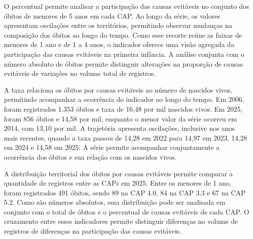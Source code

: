 
O percentual permite analisar a participação das causas evitáveis no conjunto dos óbitos de menores de 5 anos em cada CAP. Ao longo da série, os valores apresentam oscilações entre os territórios, permitindo observar mudanças na composição dos óbitos ao longo do tempo. Como esse recorte reúne as faixas de menores de 1 ano e de 1 a 4 anos, o indicador oferece uma visão agregada da participação das causas evitáveis na primeira infância. A análise conjunta com o número absoluto de óbitos permite distinguir alterações na proporção de causas evitáveis de variações no volume total de registros.


A taxa relaciona os óbitos por causas evitáveis ao número de nascidos vivos, permitindo acompanhar a ocorrência do indicador ao longo do tempo. Em 2006, foram registrados 1.353 óbitos e taxa de 16,48 por mil nascidos vivos. Em 2025, foram 856 óbitos e 14,58 por mil, enquanto o menor valor da série ocorreu em 2014, com 13,10 por mil. A trajetória apresenta oscilações, inclusive nos anos mais recentes, quando a taxa passou de 14,28 em 2022 para 14,97 em 2023, 14,28 em 2024 e 14,58 em 2025. A série permite acompanhar conjuntamente a ocorrência dos óbitos e sua relação com os nascidos vivos.


A distribuição territorial dos óbitos por causas evitáveis permite comparar a quantidade de registros entre as CAPs em 2025. Entre os menores de 1 ano, foram registrados 491 óbitos, sendo 89 na CAP 4.0, 84 na CAP 3.3 e 67 na CAP 5.2. Como são números absolutos, essa distribuição pode ser analisada em conjunto com o total de óbitos e o percentual de causas evitáveis de cada CAP. O cruzamento entre esses indicadores permite distinguir diferenças no volume de registros de diferenças na participação das causas evitáveis.

